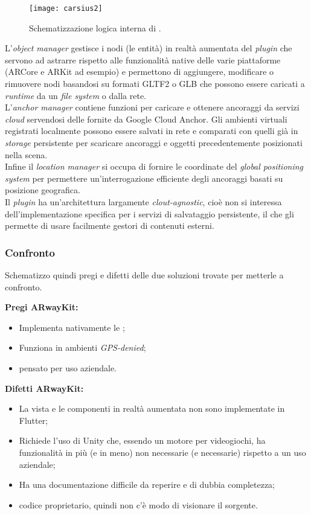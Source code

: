 \begin{figure}[H]
  \centering
  \texttt{[image: carsius2]}
  \caption[Schema \aplug{}]{Schematizzazione logica interna di \aplug{}.\footnotemark}
\end{figure}

L'\textit{object manager} gestisce i nodi (le entità) in realtà aumentata del \textit{plugin} che servono ad astrarre rispetto alle funzionalità native delle varie piattaforme (ARCore e ARKit ad esempio) e permettono di aggiungere, modificare o rimuovere nodi basandosi su formati GLTF2 o GLB che possono essere caricati a \textit{runtime} da un \textit{file system} o dalla rete.\\
L'\textit{anchor manager} contiene funzioni per caricare e ottenere ancoraggi da servizi \textit{cloud} servendosi delle \api{} fornite da Google Cloud Anchor. Gli ambienti virtuali registrati localmente possono essere salvati in rete e comparati con quelli già in \textit{storage} persistente per scaricare ancoraggi e oggetti precedentemente posizionati nella scena.\\
Infine il \textit{location manager} si occupa di fornire le coordinate del \textit{global positioning system}  per permettere un'interrogazione efficiente degli ancoraggi basati su posizione geografica.\\
Il \textit{plugin} ha un'architettura largamente \textit{clout-agnostic}, cioè non si interessa dell'implementazione specifica per i servizi di salvataggio persistente, il che gli permette di usare facilmente gestori di contenuti esterni.

\subsubsection{Confronto}
Schematizzo quindi pregi e difetti delle due soluzioni trovate per metterle a confronto.\aCapo{}

\textbf{Pregi ARwayKit:}
\begin{itemize}
  \item Implementa nativamente le \asa{};
  \item Funziona in ambienti \textit{GPS-denied};
  \item \e{} pensato per uso aziendale.
\end{itemize}

\textbf{Difetti ARwayKit:}
\begin{itemize}
  \item La vista e le componenti in realtà aumentata non sono implementate in Flutter;
  \item Richiede l'uso di Unity che, essendo un motore per videogiochi, ha funzionalità in più (e in meno) non necessarie (e necessarie) rispetto a un uso aziendale;
  \item Ha una documentazione difficile da reperire e di dubbia completezza;
  \item \e{} codice proprietario, quindi non c'è modo di visionare il sorgente.
\end{itemize}

